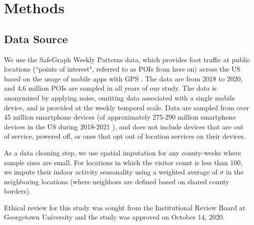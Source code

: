\documentclass{article}
\begin{document}
\section*{Methods}

\subsection*{Data Source}
We use the SafeGraph Weekly Patterns data, which provides foot traffic at public locations (``points of interest", referred to as POIs from here on) across the US based on the usage of mobile apps with GPS \cite{safegraphpatterns}. The data are from 2018 to 2020, and 4.6 million POIs are sampled in all years of our study.  The data is anonymized by applying noise, omitting data associated with a single mobile device, and is provided at the weekly temporal scale. Data are sampled from over 45 million smartphone devices (of approximately 275-290 million smartphone devices in the US during 2018-2021 \cite{smartphone}), and does not include devices that are out of service, powered off, or ones that opt out of location services on their devices.

As a data cleaning step, we use spatial imputation for any county-weeks where sample sizes are small. For locations in which the visitor count is less than 100, we impute their indoor activity seasonality using a weighted average of $\sigma$ in the neighboring locations (where neighbors are defined based on shared county borders).

Ethical review for this study was sought from the Institutional Review Board at Georgetown University and the study was approved on October 14, 2020.

\end{document}
